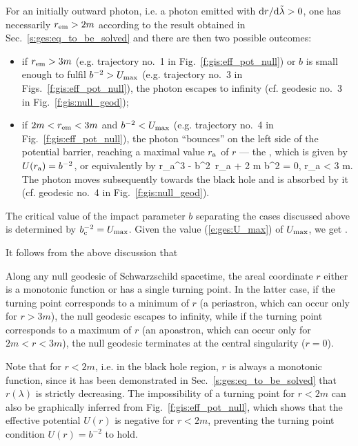 For an initially outward photon, i.e. a photon emitted with ${\mathrm{d} r}/{\mathrm{d}\tilde{\lambda}} > 0$,
one has necessarily $r_{\rm em}>2m$ according to the result obtained in Sec.~\ref{s:ges:eq_to_be_solved}
and there are then two possible outcomes:

\begin{itemize}
\item if $r_{\rm em} > 3 m$ (e.g. trajectory
no.~1 in Fig.~\ref{f:gis:eff_pot_null}) or
$b$ is small enough to fulfil $b^{-2} > U_{\rm max}$ (e.g. trajectory
no.~3 in Figs.~\ref{f:gis:eff_pot_null}), the photon escapes to infinity
(cf. geodesic no.~3 in Fig.~\ref{f:gis:null_geod});
\item if $2m < r_{\rm em} < 3 m$ and $b^{-2} < U_{\rm max}$ (e.g. trajectory
no.~4 in Fig.~\ref{f:gis:eff_pot_null}), the photon ``bounces'' on the left
side of the potential barrier, reaching a maximal value $r_{\rm a}$ of $r$
--- the ,
which is given by  $U(r_{\rm a}) = b^{-2}$, or equivalently by
\be \label{e:ges:r_apo_null}
   r_{\rm a}^3 - b^2\, r_{\rm a} + 2 m b^2 = 0, \quad r_{\rm a} < 3 m.
\ee
The photon moves subsequently towards the black hole and
is absorbed by it (cf. geodesic no.~4 in Fig.~\ref{f:gis:null_geod}).
\end{itemize}

The critical value of the impact parameter $b$ separating the cases discussed
above is determined by $b_{\rm c}^{-2} = U_{\rm max}$.
Given the value (\ref{e:ges:U_max}) of $U_{\rm max}$, we get
\be \label{e:ges:b_crit}
    .
\ee

It follows from the above discussion that
\begin{greybox}
Along any null geodesic of Schwarzschild spacetime, the areal coordinate $r$
either is a monotonic function or has a single turning point. In the latter case,
if the turning point corresponds to a minimum of $r$ (a periastron, which can occur
only for $r>3m$), the null geodesic escapes to infinity, while if the turning
point corresponds to a maximum of $r$ (an apoastron, which can occur only for $2m<r<3m$), the
null geodesic terminates at the central singularity ($r=0$).
\end{greybox}
Note that for $r<2m$, i.e. in the black hole region, $r$
is always a monotonic function, since it has been demonstrated in
Sec.~\ref{s:ges:eq_to_be_solved} that $r(\lambda)$ is strictly
decreasing. The impossibility of a turning point for $r<2m$ can also be
graphically inferred from Fig.~\ref{f:gis:eff_pot_null}, which shows
that the effective potential $U(r)$ is negative for $r<2m$,
preventing the turning point condition $U(r) = b^{-2}$ to hold.


